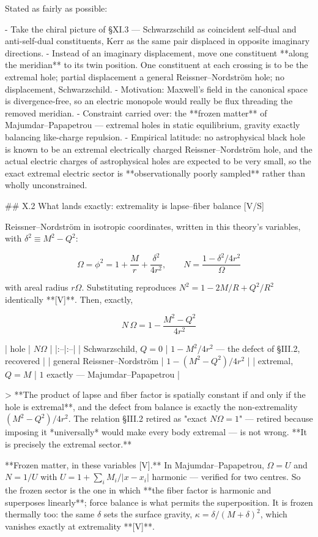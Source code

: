 Stated as fairly as possible:

- Take the chiral picture of §XI.3 — Schwarzschild as coincident self-dual and anti-self-dual constituents, Kerr as the same pair displaced in opposite imaginary directions.
- Instead of an imaginary displacement, move one constituent **along the meridian** to its twin position. One constituent at each crossing is to be the extremal hole; partial displacement a general Reissner–Nordström hole; no displacement, Schwarzschild.
- Motivation: Maxwell's field in the canonical space is divergence-free, so an electric monopole would really be flux threading the removed meridian.
- Constraint carried over: the **frozen matter** of Majumdar–Papapetrou — extremal holes in static equilibrium, gravity exactly balancing like-charge repulsion.
- Empirical latitude: no astrophysical black hole is known to be an extremal electrically charged Reissner–Nordström hole, and the actual electric charges of astrophysical holes are expected to be very small, so the exact extremal electric sector is **observationally poorly sampled** rather than wholly unconstrained.

## X.2 What lands exactly: extremality is lapse–fiber balance [V/S]

Reissner–Nordström in isotropic coordinates, written in this theory's variables, with $\delta^2\equiv M^2-Q^2$:

$$\Omega = \phi^2 = 1+\frac Mr+\frac{\delta^2}{4r^2},\qquad N = \frac{1-\delta^2/4r^2}{\Omega}$$

with areal radius $r\Omega$. Substituting reproduces $N^2 = 1-2M/R+Q^2/R^2$ identically **[V]**. Then, exactly,

$$\boxed{\ N\,\Omega = 1-\frac{M^2-Q^2}{4r^2}\ }$$

| hole | $N\Omega$ |
|:--|:--|
| Schwarzschild, $Q = 0$ | $1-M^2/4r^2$ — the defect of §III.2, recovered |
| general Reissner–Nordström | $1-(M^2-Q^2)/4r^2$ |
| extremal, $Q = M$ | $1$ exactly — Majumdar–Papapetrou |

> **The product of lapse and fiber factor is spatially constant if and only if the hole is extremal**, and the defect from balance is exactly the non-extremality $(M^2-Q^2)/4r^2$. The relation §III.2 retired as "exact $N\Omega = 1$" — retired because imposing it *universally* would make every body extremal — is not wrong. **It is precisely the extremal sector.**

**Frozen matter, in these variables [V].** In Majumdar–Papapetrou, $\Omega = U$ and $N = 1/U$ with $U = 1+\sum_iM_i/|x-x_i|$ harmonic — verified for two centres. So the frozen sector is the one in which **the fiber factor is harmonic and superposes linearly**; force balance is what permits the superposition. It is frozen thermally too: the same $\delta$ sets the surface gravity, $\kappa = \delta/(M+\delta)^2$, which vanishes exactly at extremality **[V]**.

